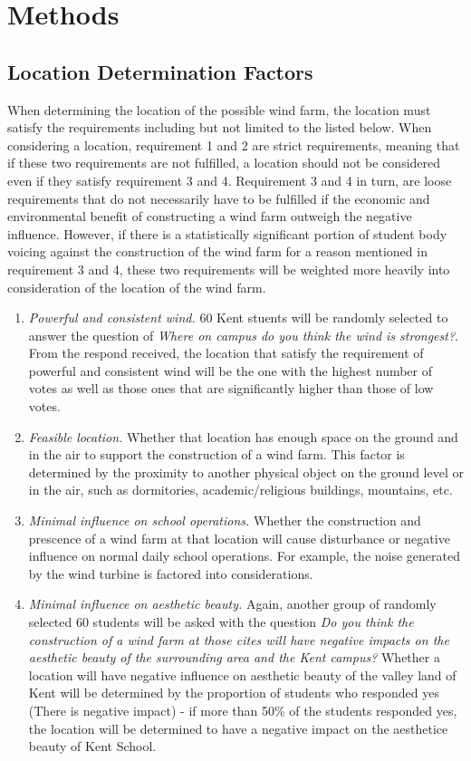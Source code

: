 \documentclass[review]{elsarticle}
\begin{document}
\section{Methods}
\label{sec:methods}

\subsection{Location Determination Factors}
When determining the location of the possible wind farm, the location must satisfy the requirements including but not limited to the 
listed below. When considering a location, requirement 1 and 2 are strict requirements, meaning that if these two requirements are not 
fulfilled, a location should not be considered even if they satisfy requirement 3 and 4. Requirement 3 and 4 in turn, are loose requirements 
that do not necessarily have to be fulfilled if the economic and environmental benefit of constructing a wind farm outweigh the negative 
influence. However, if there is a statistically significant portion of student body voicing against the construction of the wind farm for 
a reason mentioned in requirement 3 and 4, these two requirements will be weighted more heavily into consideration of the location of the wind farm.

\begin{enumerate} %
    \item \emph{Powerful and consistent wind.} 60 Kent stuents will be randomly selected to answer the question of \textit{Where on campus do you 
    think the wind is strongest?}. From the respond received, the location that satisfy the requirement of powerful and consistent wind will be the 
    one with the highest number of votes as well as those ones that are significantly higher than those of low votes.
    \item \emph{Feasible location.} Whether that location has enough space on the ground and in the air to support the construction of a wind 
    farm. This factor is determined by the proximity to another physical object on the ground level or in the air, such as dormitories, 
    academic/religious buildings, mountains, etc.
    \item \emph{Minimal influence on school operations.} Whether the construction and prescence of a wind farm at that location will cause 
    disturbance or negative influence on normal daily school operations. For example, the noise generated by the wind turbine is factored 
    into considerations.
    \item \emph{Minimal influence on aesthetic beauty.} Again, another group of randomly selected 60 students will be asked with the question 
    \textit{Do you think the construction of a wind farm at those cites will have negative impacts on the aesthetic beauty of the surrounding 
    area and the Kent campus?} Whether a location will have negative influence on aesthetic beauty of the valley land of Kent will be determined 
    by the proportion of students who responded yes (There is negative impact) - if more than 50\% of the students responded yes, the location will 
    be determined to have a negative impact on the aesthetice beauty of Kent School.
\end{enumerate}
\end{document}
